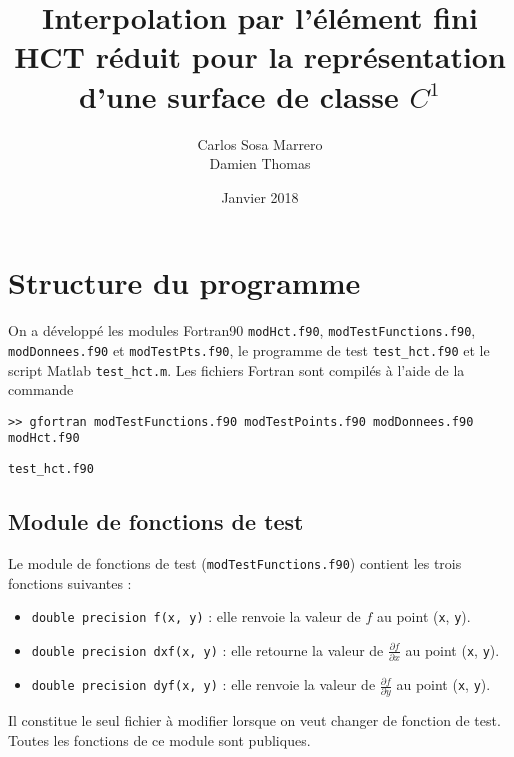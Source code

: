 \documentclass[12 pt]{article}
\title{Interpolation par l'élément fini HCT réduit
    pour la représentation d'une surface de classe $C^1$}
\date{Janvier 2018}
\author{Carlos Sosa Marrero\\
  Damien Thomas}
\begin{document}
\maketitle
\newpage
{}
\section{Structure du programme}
On a développé les modules Fortran90 \texttt{modHct.f90}, \texttt{modTestFunctions.f90}, \texttt{modDonnees.f90} et \texttt{modTestPts.f90}, le programme de test \texttt{test\_hct.f90} et le script Matlab \texttt{test\_hct.m}. Les fichiers Fortran sont compilés à l'aide de la commande

\texttt{>> gfortran modTestFunctions.f90 modTestPoints.f90 modDonnees.f90 modHct.f90}

\texttt{test\_hct.f90}
\subsection{Module de fonctions de test}
Le module de fonctions de test (\texttt{modTestFunctions.f90}) contient les trois fonctions suivantes :
\begin{itemize}
	\item \texttt{double precision f(x, y)} : elle renvoie la valeur de $f$ au point (\texttt{x}, \texttt{y}).
	\item \texttt{double precision dxf(x, y)} : elle retourne la valeur de $\frac{\partial{f}}{\partial{x}}$ au point (\texttt{x}, \texttt{y}).
	\item \texttt{double precision dyf(x, y)} : elle renvoie la valeur de $\frac{\partial{f}}{\partial{y}}$ au point (\texttt{x}, \texttt{y}).	
\end{itemize}
Il constitue le seul fichier à modifier lorsque on veut changer de fonction de test. Toutes les fonctions de ce module sont publiques.
\end{document}
